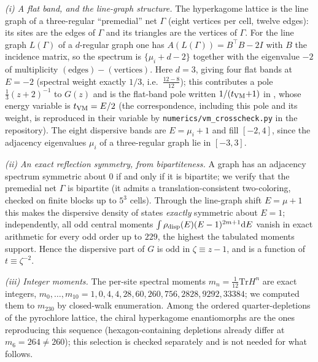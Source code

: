 \documentclass[cntp]{ipart}
\newcommand{\rmd}{\mathrm{d}}
\newcommand{\Tr}{\mathrm{Tr}}
\theoremstyle{plain}
\theoremstyle{remark}
\begin{document}
\emph{(i) A flat band, and the line-graph structure.} The hyperkagome lattice is the line graph of a three-regular
``premedial'' net $\Gamma$ (eight vertices per cell, twelve edges): its sites are the edges of $\Gamma$ and its
triangles are the vertices of $\Gamma$. For the line graph $L(\Gamma)$ of a $d$-regular graph one has
$A(L(\Gamma))=B^{\!\top}B-2I$ with $B$ the incidence matrix, so the spectrum is $\{\mu_i+d-2\}$ together with the
eigenvalue $-2$ of multiplicity $(\text{edges})-(\text{vertices})$. Here $d=3$, giving four flat bands at $E=-2$
(spectral weight exactly $1/3$, i.e.\ $\tfrac{12-8}{12}$); this contributes a pole $\tfrac13(z+2)^{-1}$ to $G(z)$
and is the flat-band pole written $1/(t_{\rm VM}{+}1)$ in \cite{VarmaMonien2013}, whose energy variable is
$t_{\rm VM}=E/2$ (the correspondence, including this pole and its weight, is reproduced in their variable by
\texttt{numerics/vm\_crosscheck.py} in the repository). The eight dispersive bands are $E=\mu_i+1$ and fill $[-2,4]$, since the adjacency
eigenvalues $\mu_i$ of a three-regular graph lie in $[-3,3]$.

\emph{(ii) An exact reflection symmetry, from bipartiteness.} A graph has an adjacency spectrum symmetric about
$0$ if and only if it is bipartite; we verify that the premedial net $\Gamma$ is bipartite (it admits a
translation-consistent two-coloring, checked on finite blocks up to $5^3$ cells). Through the line-graph shift $E=\mu+1$ this makes the dispersive density of states \emph{exactly}
symmetric about $E=1$; independently, all odd central moments
$\int\rho_{\rm disp}(E)(E-1)^{2m+1}\rmd E$ vanish in exact arithmetic for every odd order up to
$229$, the highest the tabulated moments support. Hence the dispersive part of
$G$ is odd in $\zeta\equiv z-1$, and is a function of $t\equiv\zeta^{-2}$.

\emph{(iii) Integer moments.} The per-site spectral moments $m_n=\frac{1}{12}\Tr H^n$ are exact integers,
$m_0,\dots,m_{10}=1,0,4,4,28,60,260,756,2828,9292,33384$; we computed them to $m_{230}$ by closed-walk enumeration.
Among the ordered quarter-depletions of the pyrochlore lattice, the chiral hyperkagome enantiomorphs are the ones
reproducing this sequence (hexagon-containing depletions already differ at $m_6=264\neq260$); this selection is
checked separately and is not needed for what follows.
\end{document}
